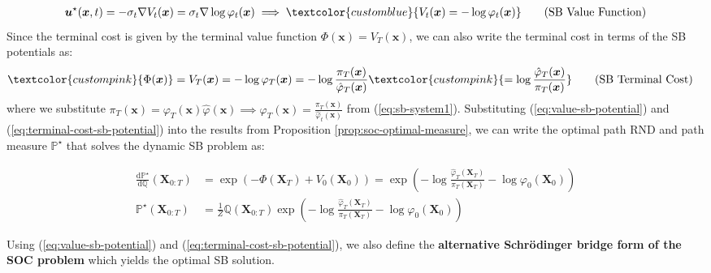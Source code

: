 \documentclass{article}
\newcommand{\bluetext}[1]{\textcolor{customblue}{#1}}
\newcommand{\pinktext}[1]{\textcolor{custompink}{#1}}
\begin{document}
\begin{align}
    \boldsymbol{u}^\star(\boldsymbol{x},t)=-\sigma_t\nabla V_t(\boldsymbol{x})=\sigma_t\nabla \log\varphi_t(\boldsymbol{x})\implies \bluetext{V_t(\boldsymbol{x})=-\log \varphi_t(\boldsymbol{x})}\tag{SB Value Function}\label{eq:value-sb-potential}
\end{align}
Since the terminal cost is given by the terminal value function $\Phi(\boldsymbol{x})=V_T(\boldsymbol{x})$, we can also write the terminal cost  in terms of the SB potentials as:
\begin{align}
    \pinktext{\Phi(\boldsymbol{x})}&=V_T(\boldsymbol{x})=-\log \varphi_T(\boldsymbol{x})=-\log \frac{\pi_T(\boldsymbol{x})}{\hat{\varphi}_T(\boldsymbol{x})}\pinktext{=\log \frac{\hat{\varphi}_T(\boldsymbol{x})}{\pi_T(\boldsymbol{x})}}\tag{SB Terminal Cost}\label{eq:terminal-cost-sb-potential}
\end{align}
where we substitute $\pi_T(\boldsymbol{x})=\varphi_T(\boldsymbol{x})\hat{\varphi}(\boldsymbol{x})\implies \varphi_T(\boldsymbol{x})=\frac{\pi_T(\boldsymbol{x})}{\hat{\varphi}_t(\boldsymbol{x})}$ from (\ref{eq:sb-system1}). Substituting (\ref{eq:value-sb-potential}) and (\ref{eq:terminal-cost-sb-potential}) into the results from Proposition \ref{prop:soc-optimal-measure}, we can write the optimal path RND and path measure $\mathbb{P}^\star$ that solves the dynamic SB problem as:
\begin{small}
\begin{align}
    \frac{\mathrm{d}\mathbb{P}^\star}{\mathrm{d}\mathbb{Q}}(\boldsymbol{X}_{0:T})&=\exp\left(-\Phi(\boldsymbol{X}_T)+V_0(\boldsymbol{X}_0)\right)=\exp\left(-\log \frac{\hat{\varphi}_T(\boldsymbol{X}_T)}{\pi_T(\boldsymbol{X}_T)}-\log \varphi_0(\boldsymbol{X}_0)\right)\tag{Optimal SB Path RND}\label{eq:optimal-sb-path-rnd}\\
    \mathbb{P}^\star(\boldsymbol{X}_{0:T})&=\frac{1}{Z}\mathbb{Q}(\boldsymbol{X}_{0:T})\exp\left(-\log \frac{\hat{\varphi}_T(\boldsymbol{X}_T)}{\pi_T(\boldsymbol{X}_T)}-\log \varphi_0(\boldsymbol{X}_0)\right)\tag{Optimal SB Path Measure}\label{eq:optimal-sb-path-measure}
\end{align}
\end{small}

Using (\ref{eq:value-sb-potential}) and (\ref{eq:terminal-cost-sb-potential}), we also define the \textbf{alternative Schrödinger bridge form of the SOC problem} which yields the optimal SB solution. 
\end{document}
